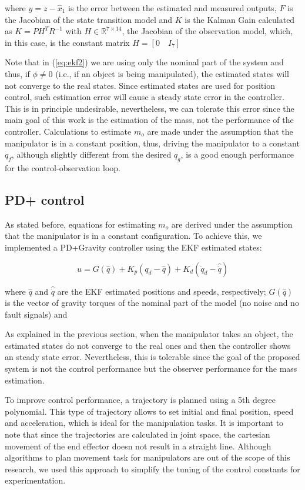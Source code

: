 \documentclass[conference,letterpaper]{ieeeconf}
\begin{document}
where $y=z - \hat{x}_1$ is the error between the estimated and measured outputs, $F$ is the Jacobian of the state transition model and $K$ is the Kalman Gain calculated as $K = PH^TR^{-1}$ with $H\in\mathbb{R}^{7\times 14}$, the Jacobian of the observation model, which, in this case, is the constant matrix $H = \left[0\quad I_7\right]$

Note that in (\ref{eq:ekf2}) we are using only the nominal part of the system and thus, if $\phi\neq 0$ (i.e., if an object is being manipulated), the estimated states will not converge to the real states. Since estimated states are used for position control, such estimation error will cause a steady state error in the controller. This is in principle undesirable, nevertheless, we can tolerate this error since the main goal of this work is the estimation of the mass, not the performance of the controller. Calculations to estimate $m_o$ are made under the assumption that the manipulator is in a constant position, thus, driving the manipulator to a constant $q_f$, although slightly different from the desired $q_g$, is a good enough performance for the control-observation loop.

\subsection{PD+ control}
As stated before, equations for estimating $m_o$ are derived under the assumption that the manipulator is in a constant configuration. To achieve this, we implemented a PD+Gravity controller using the EKF estimated states:

\begin{equation}
  u = G(\hat{q}) + K_p(q_d - \hat{q}) + K_d(\dot{q}_d - \hat{\dot{q}})
\end{equation}

where $\hat{q}$ and $\hat{\dot{q}}$ are the EKF estimated positions and speeds, respectively; $G(\hat{q})$ is the vector of gravity torques of the nominal part of the model (no noise and no fault signals) and 

As explained in the previous section, when the manipulator takes an object, the estimated states do not converge to the real ones and then the controller shows an steady state error. Nevertheless, this is tolerable since the goal of the proposed system is not the control performance but the observer performance for the mass estimation.

To improve control performance, a trajectory is planned using a 5th degree polynomial. This type of trajectory allows to set initial and final position, speed and acceleration, which is ideal for the manipulation tasks. It is important to note that since the trajectories are calculated in joint space, the cartesian movement of the end effector doesn not result in a straight line. Although algorithms to plan movement task for manipulators are out of the scope of this research, we used this approach to simplify the tuning of the control constants for experimentation.
\end{document}
